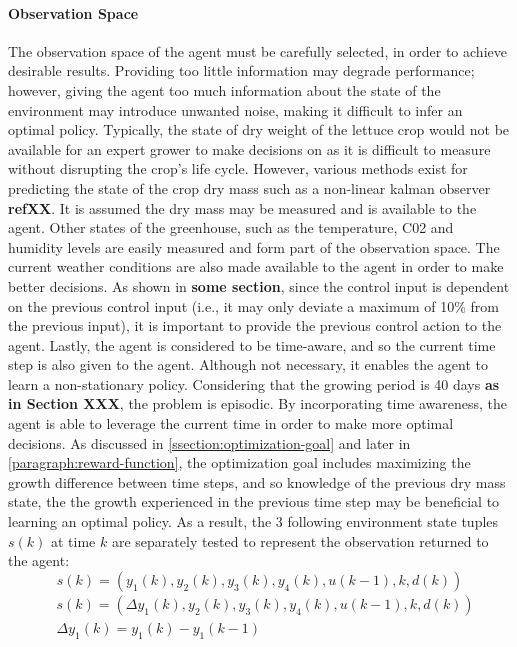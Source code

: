 \paragraph{Observation Space}
The observation space of the agent must be carefully selected, in order to achieve desirable results. Providing too little information may degrade performance; however, giving the agent too much information about the state of the environment may introduce unwanted noise, making it difficult to infer an optimal policy. Typically, the state of dry weight of the lettuce crop would not be available for an expert grower to make decisions on as it is difficult to measure without disrupting the crop's life cycle. However, various methods exist for predicting the state of the crop dry mass such as a non-linear kalman observer \textbf{refXX}. It is assumed the dry mass may be measured and is available to the agent. Other states of the greenhouse, such as the temperature, C02 and humidity levels are easily measured and form part of the observation space. The current weather conditions are also made available to the agent in order to make better decisions. As shown in \textbf{some section}, since the control input is dependent on the previous control input (i.e., it may only deviate a maximum of 10\% from the previous input), it is important to provide the previous control action to the agent. Lastly, the agent is considered to be time-aware, and so the current time step is also given to the agent. Although not necessary, it enables the agent to learn a non-stationary policy. Considering that the growing period is 40 days \textbf{as in Section XXX}, the problem is episodic. By incorporating time awareness, the agent is able to leverage the current time in order to make more optimal decisions. As discussed in \autoref{ssection:optimization-goal} and later in \autoref{paragraph:reward-function}, the optimization goal includes maximizing the growth difference between time steps, and so knowledge of the previous dry mass state, the the growth experienced in the previous time step may be beneficial to learning an optimal policy.
As a result, the 3 following environment state tuples $s(k)$ at time $k$ are separately tested to represent the observation returned to the agent:
\begin{equation}
\label{eq:obs-tuple-1}
    s(k) = (y_1(k),y_2(k),y_3(k),y_4(k), u(k-1), k, d(k))
\end{equation}
\begin{equation}
\label{eq:obs-tuple-2}
\begin{aligned}
    & s(k) = (\Delta y_1(k),y_2(k),y_3(k),y_4(k), u(k-1), k, d(k)) \\
    & \Delta y_1(k) = y_1(k) - y_1(k-1)
\end{aligned}
\end{equation}
